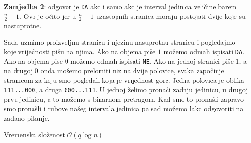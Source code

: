 \documentclass[a4paper]{article}
\begin{document}
\textbf{Zamjedba 2}: odgovor je \texttt{DA} ako i samo ako je interval jedinica
veličine barem $\frac{n}{2}+1$. Ovo je očito jer u $\frac{n}{2}+1$ uzastopnih
stranica moraju postojati dvije koje su nastuprotne.

Sada uzmimo proizvoljnu stranicu i njezinu nasuprotnu stranicu i pogledajmo
koje vrijednosti pišu na njima. Ako na objema piše $1$ možemo odmah ispisati
\texttt{DA}. Ako na objema pise $0$ možemo odmah ispisati \texttt{NE}. Ako na
jednoj stranici piše $1$, a na drugoj $0$ onda možemo prelomiti niz na dvije
polovice, svaka započinje stranicom za koju smo pogledali koja je vrijednost
gore. Jedna polovica je oblika \texttt{111...000}, a druga \texttt{000...111}.
U jednoj želimo pronaći zadnju jedinicu, u drugoj prvu jedinicu, a to možemo s
binarnom pretragom. Kad smo to pronašli zapravo smo pronašli i rubove našeg
intervala jedinica pa sad možemo lako odgovoriti na zadano pitanje.

Vremenska složenost $\mathcal{O}(q \log n)$
\end{document}
